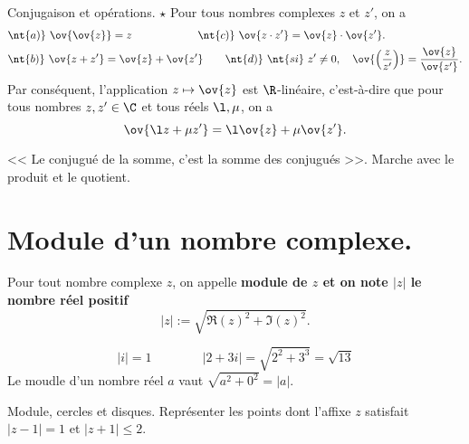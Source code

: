 \documentclass[11pt]{article}
\begin{document}
\begin{prop}{Conjugaison et opérations. $\star$}{}
    Pour tous nombres complexes $z$ et $z'$, on a
    \begin{align*}
        &\nt{a)}~\ov{\ov{z}}=z \qquad\qquad\qquad \nt{c)}~\ov{z\cdot z'}=\ov{z}\cdot\ov{z'}.\\
        &\nt{b)}~\ov{z+z'}=\ov{z}+\ov{z'}\qquad\nt{d)}~\nt{si}~z'\neq0,\quad\ov{\left( \frac{z}{z'} \right)}=\frac{\ov{z}}{\ov{z'}}.
    \end{align*}
    Par conséquent, l'application $z\mapsto\ov{z}$ est $\R$-linéaire, c'est-à-dire que pour tous nombres $z,z'\in\C$ et tous réels $\l,\mu$, on a
    \begin{equation*}
        \ov{\l z + \mu z'} = \l \ov{z} + \mu \ov{z'}.
    \end{equation*}
\end{prop}
<< Le conjugué de la somme, c'est la somme des conjugués >>. Marche avec le produit et le quotient.

\section{Module d'un nombre complexe.}

\begin{defi}{}{}
    Pour tout nombre complexe $z$, on appelle \bf{module} de $z$ et on note $|z|$ le nombre réel positif
    \begin{equation*}
        |z|:=\sqrt{\Re(z)^2+\Im(z)^2}.
    \end{equation*}
\end{defi}

\begin{ex}{}{}
    \begin{equation*}
        |i|=1\qquad\qquad|2+3i|=\sqrt{2^2+3^3}=\sqrt{13}
    \end{equation*}
    Le moudle d'un nombre réel $a$ vaut $\sqrt{a^2+0^2}=|a|$.
\end{ex}

\begin{center}
\end{center}

\begin{ex}{Module, cercles et disques.}{}
    Représenter les points dont l'affixe $z$ satisfait $|z-1|=1$ et $|z+1|\leq2$.
\end{ex}
\end{document}
